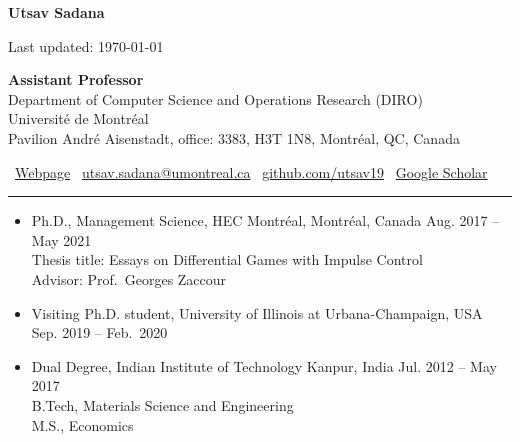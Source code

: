 \documentclass[12pt]{article}
\renewcommand{\section}[1]{
\vspace{0.25em}
\noindent{\normalfont\large\bfseries\color{black} #1}\par
\vspace{-0.24em}
\noindent\textcolor{black}{\rule{0.55\textwidth}{1.1pt}}
\vspace{0.48em}
}
\newenvironment{midlist}[1][\enskip\textbullet]%
        {\begin{itemize}[#1,leftmargin=*,parsep=0pt,itemsep=4pt,topsep=2pt,partopsep=0pt]}
        {\end{itemize}}
\providecommand*\email[1]{\href{mailto:#1}{#1}}
\begin{document}
\begin{center}
{\huge\bfseries Utsav Sadana\par}
\vspace{0.12em}
\vspace{0.18em}
\vspace{0.5em}
{\small Last updated: \today\par}
\end{center}
\vspace{0.3em}
\noindent\textbf{Assistant Professor}\\
Department of Computer Science and Operations Research (DIRO) \\
Université de Montréal\\
 Pavilion André Aisenstadt, office: 3383, H3T 1N8, Montréal, QC, Canada

\smallskip
\noindent{}~\href{https://utsav19.github.io}{Webpage} \quad {}~\email{utsav.sadana@umontreal.ca} \quad {}~\href{https://github.com/Utsav19}{github.com/utsav19} \quad \faGraduationCap~\href{https://scholar.google.com/citations?user=zNK9YqoAAAAJ&hl=en}{Google Scholar}
\vspace{0.5em}
 
\section{Education}
\begin{midlist}
        \item Ph.D.,  Management Science, HEC Montr\'eal, Montréal, Canada \hfill{Aug. 2017 -- May 2021}\\
Thesis title: Essays on Differential Games with Impulse Control\\
Advisor: Prof.~Georges Zaccour

\item Visiting Ph.D. student, University of Illinois at Urbana-Champaign,  USA \hfill{Sep. 2019 -- Feb.~2020}
\item  Dual Degree, Indian Institute of Technology Kanpur, India \hfill{Jul. 2012 -- May 2017}\\
B.Tech, Materials Science and Engineering\\
M.S., Economics
\end{midlist}
\vspace{0.4em}
\end{document}
